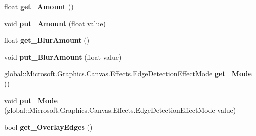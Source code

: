 \begin{DoxyCompactItemize}
float {\bfseries get\+\_\+\+Amount} ()
\item 
\mbox{\label{interface_microsoft_1_1_graphics_1_1_canvas_1_1_effects_1_1_i_edge_detection_effect_a25aa355d10926221fb18d7b5ab5d121b}} 
void {\bfseries put\+\_\+\+Amount} (float value)
\item 
\mbox{\label{interface_microsoft_1_1_graphics_1_1_canvas_1_1_effects_1_1_i_edge_detection_effect_a34600b9441ec9b1822069023c004b06d}} 
float {\bfseries get\+\_\+\+Blur\+Amount} ()
\item 
\mbox{\label{interface_microsoft_1_1_graphics_1_1_canvas_1_1_effects_1_1_i_edge_detection_effect_ae34ee491a4a76a40ac93a1257d408521}} 
void {\bfseries put\+\_\+\+Blur\+Amount} (float value)
\item 
\mbox{\label{interface_microsoft_1_1_graphics_1_1_canvas_1_1_effects_1_1_i_edge_detection_effect_af4eed9893a7039265777bc63d06a5dad}} 
global\+::\+Microsoft.\+Graphics.\+Canvas.\+Effects.\+Edge\+Detection\+Effect\+Mode {\bfseries get\+\_\+\+Mode} ()
\item 
\mbox{\label{interface_microsoft_1_1_graphics_1_1_canvas_1_1_effects_1_1_i_edge_detection_effect_ab506181e7ae373678c372e670ca4e7dc}} 
void {\bfseries put\+\_\+\+Mode} (global\+::\+Microsoft.\+Graphics.\+Canvas.\+Effects.\+Edge\+Detection\+Effect\+Mode value)
\item 
\mbox{\label{interface_microsoft_1_1_graphics_1_1_canvas_1_1_effects_1_1_i_edge_detection_effect_a3d82aa6e19802e82c6cfe865d511e72f}} 
bool {\bfseries get\+\_\+\+Overlay\+Edges} ()
\item 
\mbox{\label{interface_microsoft_1_1_graphics_1_1_canvas_1_1_effects_1_1_i_edge_detection_effect_a14bee1ac205a14649a9a545112bce70b}} 

\end{DoxyCompactItemize}
